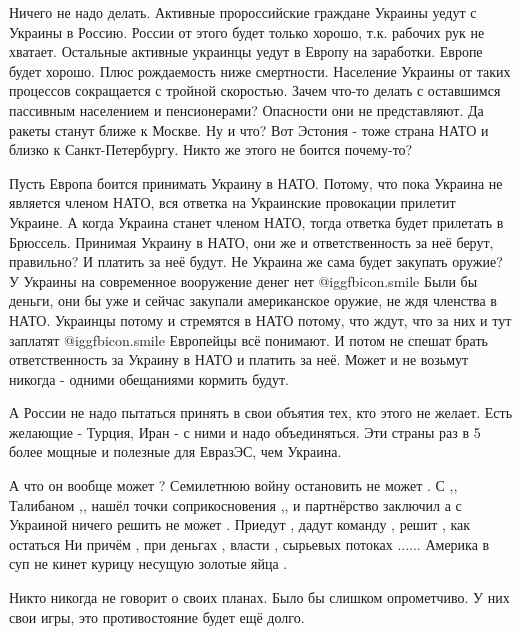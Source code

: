 \begin{itemize}

Ничего не надо делать. Активные пророссийские граждане Украины уедут с Украины
в Россию. России от этого будет только хорошо, т.к. рабочих рук не хватает.
Остальные активные украинцы уедут в Европу на заработки. Европе будет хорошо.
Плюс рождаемость ниже смертности. Население Украины от таких процессов
сокращается с тройной скоростью. Зачем что-то делать с оставшимся пассивным
населением и пенсионерами? Опасности они не представляют. Да ракеты станут
ближе к Москве. Ну и что? Вот Эстония - тоже страна НАТО и близко к
Санкт-Петербургу. Никто же этого не боится почему-то?

Пусть Европа боится принимать Украину в НАТО. Потому, что пока Украина не
является членом НАТО, вся ответка на Украинские провокации прилетит Украине. А
когда Украина станет членом НАТО, тогда ответка будет прилетать в Брюссель.
Принимая Украину в НАТО, они же и ответственность за неё берут, правильно? И
платить за неё будут. Не Украина же сама будет закупать оружие? У Украины на
современное вооружение денег нет  @igg{fbicon.smile}  Были бы деньги, они бы уже и сейчас
закупали американское оружие, не ждя членства в НАТО. Украинцы потому и
стремятся в НАТО потому, что ждут, что за них и тут заплатят  @igg{fbicon.smile}  Европейцы всё
понимают. И потом не спешат брать ответственность за Украину в НАТО и платить
за неё. Может и не возьмут никогда - одними обещаниями кормить будут.

А России не надо пытаться принять в свои объятия тех, кто этого не желает. Есть
желающие - Турция, Иран - с ними и надо объединяться. Эти страны раз в 5 более
мощные и полезные для ЕвразЭС, чем Украина.


А что он вообще может ? Семилетнюю войну остановить не может . С ,, Талибаном
,, нашёл точки соприкосновения ,, и партнёрство заключил а с Украиной ничего
решить не может . Приедут , дадут команду , решит , как остаться Ни причём ,
при деньгах , власти , сырьевых потоках ...... Америка в суп не кинет курицу
несущую золотые яйца .


Никто никогда не говорит о своих планах. Было бы слишком опрометчиво.
У них свои игры, это противостояние будет ещё долго.



\end{itemize}
